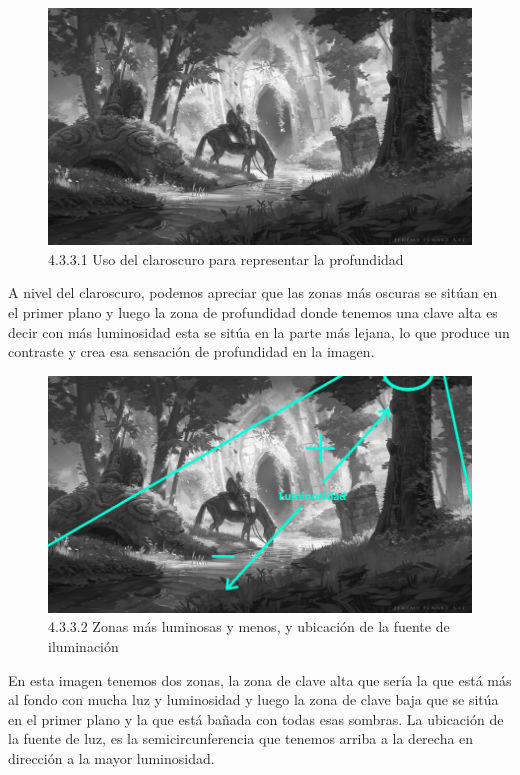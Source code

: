 \documentclass[12pt]{article}
\begin{document}
        
    \begin{figure}[H]
      \centering
      \includegraphics[scale=0.7]{images/Saúl/Sección 3/EA_img3_3Claroscuro_1Profundidad.png}
      \caption{\small 4.3.3.1 Uso del claroscuro para representar la profundidad}
    \end{figure}

A nivel del claroscuro, podemos apreciar que las zonas más oscuras se sitúan en el primer plano y luego la zona de profundidad donde tenemos una clave alta es decir con más luminosidad esta se sitúa en la parte más lejana, lo que produce un contraste y crea esa sensación de profundidad en la imagen.

    \begin{figure}[H]
      \centering
      \includegraphics[scale=0.7]{images/Saúl/Sección 3/EA_img3_3Claroscuro_2Luminosidad.png}
      \caption{\small 4.3.3.2 Zonas más luminosas y menos, y ubicación de la fuente de iluminación}
    \end{figure}

En esta imagen tenemos dos zonas, la zona de clave alta que sería la que está más al fondo con mucha luz y luminosidad y luego la zona de clave baja que se sitúa en el primer plano y la que está bañada con todas esas sombras. La ubicación de la fuente de luz, es la semicircunferencia que tenemos arriba a la derecha en dirección a la mayor luminosidad.
\end{document}
